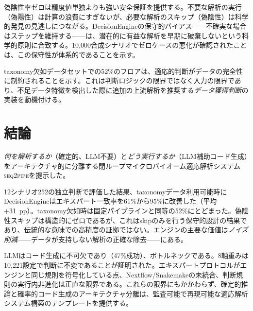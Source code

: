 \documentclass[11pt,a4paper]{article}
\newcommand{\seqpipe}{\textsc{seq2pipe}}
\begin{document}
偽陰性率ゼロは精度値単独よりも強い安全保証を提供する。不要な解析の実行（偽陽性）は計算の浪費にすぎないが、必要な解析のスキップ（偽陰性）は科学的発見の見逃しにつながる。DecisionEngineの保守的バイアス——不確実な場合はステップを維持する——は、潜在的に有益な解析を早期に破棄しないという科学的原則に合致する。10,000合成シナリオでゼロケースの悪化が確認されたことは、この保守性が体系的であることを示す。

taxonomy欠如データセットでの52\%のフロアは、適応的判断がデータの完全性に制約されることを示す。これは判断ロジックの限界ではなく入力の限界であり、不足データ特徴を検出した際に追加の上流解析を推奨する\textit{データ獲得判断}の実装を動機付ける。

\section{結論}
\label{sec:conclusion}

\textit{何を解析するか}（確定的、LLM不要）と\textit{どう実行するか}（LLM補助コード生成）をアーキテクチャ的に分離する閉ループマイクロバイオーム適応解析システム\seqpipe を提示した。

12シナリオ252の独立判断で評価した結果、taxonomyデータ利用可能時にDecisionEngineはエキスパート一致率を61\%から95\%に改善した（平均+31~pp）。taxonomy欠如時は固定パイプラインと同等の52\%にとどまった。偽陰性スキップは構造的にゼロであるが、これはskipのみを行う保守的設計の結果であり、伝統的な意味での高精度の証拠ではない。エンジンの主要な価値は\textit{ノイズ削減}——データが支持しない解析の正確な除去——にある。

LLMはコード生成に不可欠であり（47\%成功）、ボトルネックである。8軸重みは10,221設定で判断に不変であることが証明された。エキスパートプロトコルがエンジンと同じ規則を符号化している点、Nextflow/Snakemakeの未統合、判断規則の実行内非進化は正直な限界である。これらの限界にもかかわらず、確定的推論と確率的コード生成のアーキテクチャ分離は、監査可能で再現可能な適応解析システム構築のテンプレートを提供する。
\end{document}
